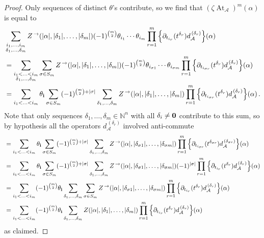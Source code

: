 \documentclass[english,letter paper,12pt,leqno]{article}
\theoremstyle{example}
\numberwithin{equation}{section}
\def\AA{\mathcal{A}}
\DeclareMathOperator{\vAt}{At}
\begin{document}
\begin{proof}
Only sequences of distinct $\theta$'s contribute, so we find that $(\zeta \vAt_{\AA})^m(\alpha)$ is equal to
\begin{align*}
&\sum_{\substack{i_1,\ldots,i_m \\ \delta_1,\ldots,\delta_m}} Z^{\,\rightarrow}(|\alpha|,|\delta_1|,\ldots,|\delta_m|) (-1)^{\binom{m}{2}} \theta_{i_1} \cdots \theta_{i_m} \prod_{r=1}^m \Big\{ \partial_{t_{i_r}}(t^{\delta_r}) d_{\AA}^{\,(\delta_r)} \Big\} (\alpha)\\
&= \sum_{\substack{i_1 < \ldots < i_m \\ \delta_1,\ldots,\delta_m}} \sum_{\sigma \in S_m} Z^{\,\rightarrow}(|\alpha|,|\delta_1|,\ldots,|\delta_m|) (-1)^{\binom{m}{2}} \theta_{i_{\sigma 1}} \cdots \theta_{i_{\sigma m}} \prod_{r=1}^m \Big\{ \partial_{t_{i_{\sigma r}}}(t^{\delta_r}) d_{\AA}^{\,(\delta_r)} \Big\} (\alpha)\\
&= \sum_{i_1 < \ldots < i_m} \theta_{\bold{i}} \sum_{\sigma \in S_m} (-1)^{\binom{m}{2} + |\sigma|} \sum_{\delta_1,\ldots,\delta_m} Z^{\,\rightarrow}(|\alpha|,|\delta_1|,\ldots,|\delta_m|)  \prod_{r=1}^m \Big\{ \partial_{t_{i_{\sigma r}}}(t^{\delta_r}) d_{\AA}^{\,(\delta_r)} \Big\} (\alpha)\,.
\end{align*}
Note that only sequences $\delta_1,\ldots,\delta_m \in \mathbb{N}^n$ with all $\delta_i \neq \bold{0}$ contribute to this sum, so by hypothesis all the operators $d_{\AA}^{\,(\delta_r)}$ involved anti-commute
\begin{align*}
&= \sum_{i_1 < \ldots < i_m} \theta_{\bold{i}} \sum_{\sigma \in S_m} (-1)^{\binom{m}{2} + |\sigma|} \sum_{\delta_1,\ldots,\delta_m} Z^{\,\rightarrow}(|\alpha|,|\delta_{\sigma 1}|,\ldots,|\delta_{\sigma m}|)  \prod_{r=1}^m \Big\{ \partial_{t_{i_{\sigma r}}}(t^{\delta_{\sigma r}}) d_{\AA}^{\,(\delta_{\sigma r})} \Big\} (\alpha)\\
&= \sum_{i_1 < \ldots < i_m} \theta_{\bold{i}} \sum_{\sigma \in S_m} (-1)^{\binom{m}{2} + |\sigma|} \sum_{\delta_1,\ldots,\delta_m} Z^{\,\rightarrow}(|\alpha|,|\delta_{\sigma 1}|,\ldots,|\delta_{\sigma m}|) (-1)^{|\sigma|} \prod_{r=1}^m \Big\{ \partial_{t_{i_r}}(t^{\delta_{r}}) d_{\AA}^{\,(\delta_{r})} \Big\} (\alpha)\\
&= \sum_{i_1 < \ldots < i_m} (-1)^{\binom{m}{2}} \theta_{\bold{i}}   \sum_{\delta_1,\ldots,\delta_m} \sum_{\sigma \in S_m} Z^{\,\rightarrow}(|\alpha|,|\delta_{\sigma 1}|,\ldots,|\delta_{\sigma m}|) \prod_{r=1}^m \Big\{ \partial_{t_{i_r}}(t^{\delta_{r}}) d_{\AA}^{\,(\delta_{r})} \Big\} (\alpha)\\
&= \sum_{i_1 < \ldots < i_m} (-1)^{\binom{m}{2}} \theta_{\bold{i}}   \sum_{\delta_1,\ldots,\delta_m} Z(|\alpha|,|\delta_{1}|,\ldots,|\delta_{m}|) \prod_{r=1}^m \Big\{ \partial_{t_{i_r}}(t^{\delta_{r}}) d_{\AA}^{\,(\delta_{r})} \Big\} (\alpha)
\end{align*}
as claimed.
\end{proof}
\end{document}
